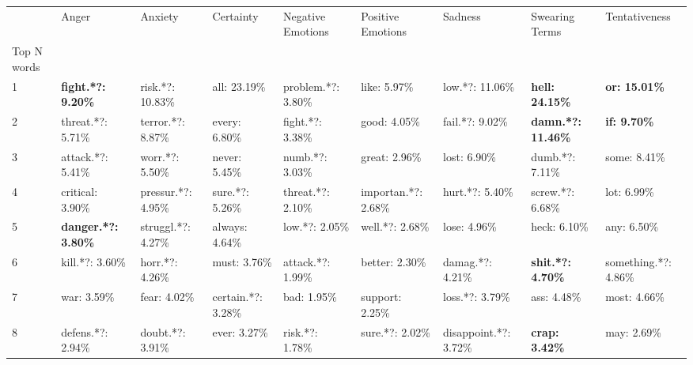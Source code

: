\begin{tabular}{lllllllll}
\toprule
{} &                       Anger &               Anxiety &              Certainty &     Negative Emotions &    Positive Emotions &                Sadness &             Swearing Terms &         Tentativeness \\
Top N words          &                             &                       &                        &                       &                      &                        &                            &                       \\
\midrule
1                    &   \textbf{fight.*?: 9.20\%} &      risk.*?: 10.83\% &           all: 23.19\% &    problem.*?: 3.80\% &         like: 5.97\% &        low.*?: 11.06\% &     \textbf{hell: 24.15\%} &  \textbf{or: 15.01\%} \\
2                    &           threat.*?: 5.71\% &     terror.*?: 8.87\% &          every: 6.80\% &      fight.*?: 3.38\% &         good: 4.05\% &        fail.*?: 9.02\% &  \textbf{damn.*?: 11.46\%} &   \textbf{if: 9.70\%} \\
3                    &           attack.*?: 5.41\% &       worr.*?: 5.50\% &          never: 5.45\% &       numb.*?: 3.03\% &        great: 2.96\% &           lost: 6.90\% &            dumb.*?: 7.11\% &          some: 8.41\% \\
4                    &            critical: 3.90\% &    pressur.*?: 4.95\% &        sure.*?: 5.26\% &     threat.*?: 2.10\% &  importan.*?: 2.68\% &        hurt.*?: 5.40\% &           screw.*?: 6.68\% &           lot: 6.99\% \\
5                    &  \textbf{danger.*?: 3.80\%} &    struggl.*?: 4.27\% &         always: 4.64\% &        low.*?: 2.05\% &      well.*?: 2.68\% &           lose: 4.96\% &               heck: 6.10\% &           any: 6.50\% \\
6                    &             kill.*?: 3.60\% &       horr.*?: 4.26\% &           must: 3.76\% &     attack.*?: 1.99\% &       better: 2.30\% &       damag.*?: 4.21\% &   \textbf{shit.*?: 4.70\%} &  something.*?: 4.86\% \\
7                    &                 war: 3.59\% &          fear: 4.02\% &     certain.*?: 3.28\% &           bad: 1.95\% &      support: 2.25\% &        loss.*?: 3.79\% &                ass: 4.48\% &          most: 4.66\% \\
8                    &           defens.*?: 2.94\% &      doubt.*?: 3.91\% &           ever: 3.27\% &       risk.*?: 1.78\% &      sure.*?: 2.02\% &  disappoint.*?: 3.72\% &      \textbf{crap: 3.42\%} &           may: 2.69\% \\

\end{tabular}
